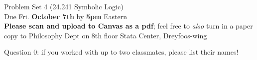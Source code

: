 \documentclass[12pt]{article}
\begin{document}

%
\newcommand{\detritus}[1]{}


\thispagestyle{empty}


\iffalse
\parindent = 0pt
\hspace*{0.0in}\parbox[t]{2.5in}{
Philosophy 24.241\\[3pt]
Symbolic Logic\\[3pt]
Fall, 2022
}
\fi 


\iffalse 
\begin{center}
\Large\bf Problem Set 4\\[1ex] 
 Due Fri. {\bf{October 7th}} by 5pm Eastern\\[3ex]
\end{center}
\fi

\begin{center}
\Large Problem Set 4 \large{(24.241 Symbolic Logic)}\\[1ex] 
 Due Fri. \textbf{October 7th} by \textbf{5pm} Eastern\\ \normalsize{\textbf{Please scan and upload to Canvas as a pdf}; feel free to \textit{also} turn in a paper copy to Philosophy Dept on 8th floor Stata Center, Dreyfoos-wing} \\[3ex] 
\end{center}

Question 0: if you worked with up to two classmates, please list their names! 

\end{document}
